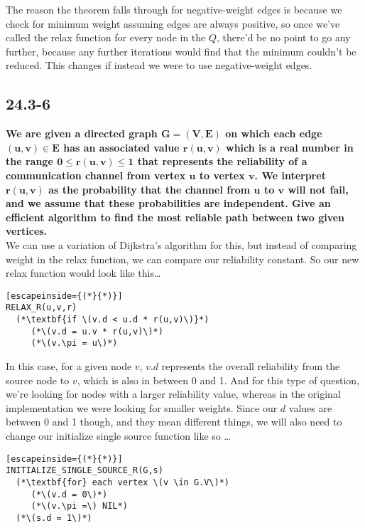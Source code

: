 \documentclass[11pt]{article}
\begin{document}
 The reason the theorem falls through for negative-weight edges is because we check for minimum 
 weight assuming edges are always positive, so once we've called the relax function for every node 
 in the \(Q\), there'd be no point to go any further, because any further iterations would find 
 that the minimum couldn't be reduced.  This changes if instead we were to use negative-weight 
 edges.

 \newpage

 \subsection*{24.3-6}
 \textbf{We are given a directed graph \(\mathbf{G = (V,E)}\) on which each edge 
 \(\mathbf{(u,v) \in E}\) has an associated value \(\mathbf{r(u,v)}\) which is a real number in the 
 range \(\mathbf{0 \leq r(u,v) \leq 1}\) that represents the reliability of a communication channel 
 from vertex \(\mathbf{u}\) to vertex \(\mathbf{v}\). We interpret \(\mathbf{r(u,v)}\) as the 
 probability that the channel from \(\mathbf{u}\) to \(\mathbf{v}\) will not fail, and we assume 
 that these probabilities are independent. Give an efficient algorithm to find the most reliable 
 path between two given vertices.} \\ 

 We can use a variation of Dijkstra's algorithm for this, but instead of comparing weight in the 
 relax function, we can compare our reliability constant.  So our new relax function would look 
 like this\dots
\begin{lstlisting}[escapeinside={(*}{*)}]
RELAX_R(u,v,r)
  (*\textbf{if \(v.d < u.d * r(u,v)\)}*)
     (*\(v.d = u.v * r(u,v)\)*)
     (*\(v.\pi = u\)*)
\end{lstlisting}

In this case, for a given node \(v\), \(v.d\) represents the overall reliability from the source 
node to \(v\), which is also in between 0 and 1.  And for this type of question, we're looking for 
nodes with a larger reliability value, whereas in the original implementation we were looking for 
smaller weights.  Since our \(d\) values are between 0 and 1 though, and they mean different things, 
we will also need to change our initialize single source function like so \dots
\begin{lstlisting}[escapeinside={(*}{*)}]
INITIALIZE_SINGLE_SOURCE_R(G,s)
  (*\textbf{for} each vertex \(v \in G.V\)*)
     (*\(v.d = 0\)*)
     (*\(v.\pi =\) NIL*)
  (*\(s.d = 1\)*)
\end{lstlisting}
\end{document}

